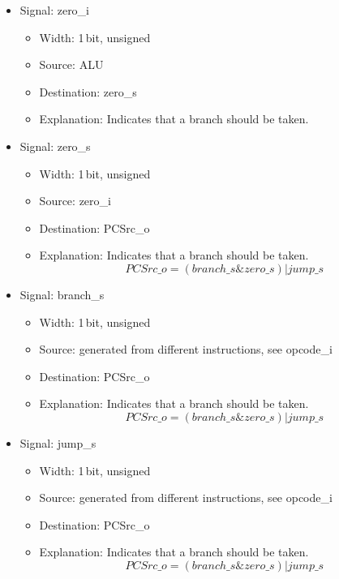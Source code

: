 \begin{itemize}
\begin{itemize}
    \item Width: 1\,bit, unsigned
    \item Source: Instruction from I-Mem.
    \item Destination: Case statement generating controls\_s and aluSel\_o, rTypeSubtract\_s
    \item Explanation: Differentiates between ADD and SUB, shift variants
  \end{itemize}
  \item Signal: zero\_i
  \begin{itemize}
    \item Width: 1\,bit, unsigned
    \item Source: ALU
    \item Destination: zero\_s
    \item Explanation: Indicates that a branch should be taken.
  \end{itemize}
  \item Signal: zero\_s
  \begin{itemize}
    \item Width: 1\,bit, unsigned
    \item Source: zero\_i
    \item Destination: PCSrc\_o
    \item Explanation: Indicates that a branch should be taken. \[ PCSrc\_o=(branch\_s \& zero\_s) | jump\_s \]
  \end{itemize}
  \item Signal: branch\_s
  \begin{itemize}
    \item Width: 1\,bit, unsigned
    \item Source: generated from different instructions, see opcode\_i
    \item Destination: PCSrc\_o
    \item Explanation: Indicates that a branch should be taken. \[ PCSrc\_o=(branch\_s \& zero\_s) | jump\_s \]
  \end{itemize}
  \item Signal: jump\_s
  \begin{itemize}
    \item Width: 1\,bit, unsigned
    \item Source: generated from different instructions, see opcode\_i
    \item Destination: PCSrc\_o
    \item Explanation: Indicates that a branch should be taken. \[ PCSrc\_o=(branch\_s \& zero\_s) | jump\_s \]

\end{itemize}
\end{itemize}
